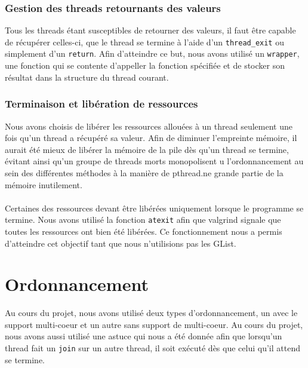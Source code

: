 \documentclass{article}
\begin{document}
			\subsubsection{Gestion des threads retournants des valeurs}
            Tous les threads étant susceptibles de retourner des valeurs, il
            faut être capable de récupérer celles-ci, que le thread se
            termine à l'aide d'un \verb!thread_exit! ou simplement d'un
            \verb!return!. Afin d'atteindre ce but, nous avons utilisé un
            \verb!wrapper!, une fonction qui se contente d'appeller la
            fonction spécifiée et de stocker son résultat dans la structure
            du thread courant.
			
			\subsubsection{Terminaison et libération de ressources}
            Nous avons choisis de libérer les ressources allouées à un thread
            seulement une fois qu'un thread a récupéré sa valeur. Afin de
            diminuer l'empreinte mémoire, il aurait été mieux de libérer
            la mémoire de la pile dès qu'un thread se termine, évitant ainsi
            qu'un groupe de threads morts monopolisent u
		l'ordonnancement au sein des différentes méthodes à la manière
        de pthread.ne grande partie de
            la mémoire inutilement.
            \paragraph{}
            Certaines des ressources devant être libérées uniquement lorsque
            le programme se termine. Nous avons utilisé la fonction
            \verb!atexit! afin que valgrind signale que toutes les
            ressources ont bien été libérées. Ce fonctionnement nous a permis
            d'atteindre cet objectif tant que nous n'utilisions pas les
            GList.
		

	\section{Ordonnancement}
    Au cours du projet, nous avons utilisé deux types d'ordonnancement, un
    avec le support multi-coeur et un autre sans support de multi-coeur. Au
    cours du projet, nous avons aussi utilisé une astuce qui nous a été
    donnée afin que lorsqu'un thread fait un \verb!join! sur un autre
    thread, il soit exécuté dès que celui qu'il attend se termine.
\end{document}
